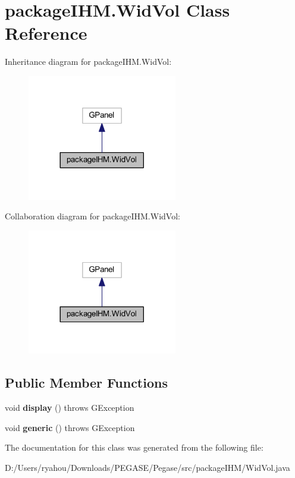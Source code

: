 \hypertarget{classpackage_i_h_m_1_1_wid_vol}{}\section{package\+I\+H\+M.\+Wid\+Vol Class Reference}
\label{classpackage_i_h_m_1_1_wid_vol}


Inheritance diagram for package\+I\+H\+M.\+Wid\+Vol\+:
\nopagebreak
\begin{figure}[H]
\begin{center}
\leavevmode
\includegraphics[width=185pt]{classpackage_i_h_m_1_1_wid_vol__inherit__graph}
\end{center}
\end{figure}


Collaboration diagram for package\+I\+H\+M.\+Wid\+Vol\+:
\nopagebreak
\begin{figure}[H]
\begin{center}
\leavevmode
\includegraphics[width=185pt]{classpackage_i_h_m_1_1_wid_vol__coll__graph}
\end{center}
\end{figure}
\subsection*{Public Member Functions}
\begin{DoxyCompactItemize}
\item 
\mbox{\label{classpackage_i_h_m_1_1_wid_vol_a697cdbd48911139aa7de66f40b8883b9}} 
void {\bfseries display} ()  throws G\+Exception 
\item 
\mbox{\label{classpackage_i_h_m_1_1_wid_vol_adb6ad1f0a2e82b0cd231ae9f175de759}} 
void {\bfseries generic} ()  throws G\+Exception 
\end{DoxyCompactItemize}


The documentation for this class was generated from the following file\+:\begin{DoxyCompactItemize}
\item 
D\+:/\+Users/ryahou/\+Downloads/\+P\+E\+G\+A\+S\+E/\+Pegase/src/package\+I\+H\+M/Wid\+Vol.\+java\end{DoxyCompactItemize}
